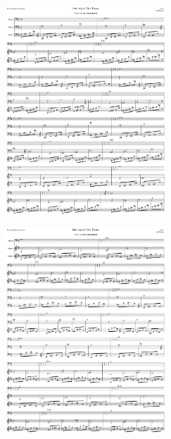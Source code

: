 \begin{figure}[H]                                             
{                                                             
  \setlength{\tabcolsep}{3.0pt}                               
  \setlength\cmidrulewidth{\heavyrulewidth} %
    \begin{subfigure}{0.5\textwidth}                            
  \includegraphics[width=6cm]{music/title_no_73_page_1001.png}%
    \end{subfigure}                                             
  \begin{subfigure}{0.5\textwidth}                            
  \includegraphics[width=6cm]{music/title_no_74_page_1001.png}%
    \end{subfigure}                                             
}                                                             
\end{figure}                                                  


